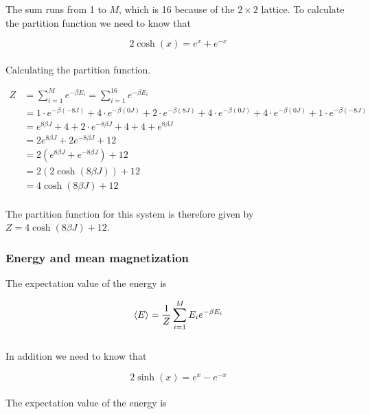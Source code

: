\documentclass{article}
\begin{document}
The sum runs from 1 to $M$, which is 16 because of the $ 2 \times 2 $ lattice. To calculate the partition function we need to know that

\begin{equation*}
    2 \cosh (x) = e^x + e^{-x}
\end{equation*} \\

Calculating the partition function.

\begin{align*}
  Z &= \sum_{i=1} ^{M} e^{- \beta E_i} = \sum_{i=1} ^{16} e^{- \beta E_i} \\
  &= 1 \cdot e^{- \beta (-8J)} + 4 \cdot e^{- \beta (0J)} + 2 \cdot e^{- \beta (8J)} + 4 \cdot e^{- \beta (0J)}
  + 4 \cdot e^{- \beta (0J)} + 1 \cdot e^{- \beta (-8J)} \\
  &= e^{8 \beta J} + 4 + 2 \cdot e^{-8 \beta J} + 4 + 4 + e^{8 \beta J} \\
  &= 2 e^{8 \beta J } + 2 e^{-8 \beta J} + 12 \\
  &= 2 \left( e^{8 \beta J} + e^{- 8 \beta J} \right) + 12 \\
  &= 2 \left( 2 \cosh(8 \beta J) \right) + 12 \\
  &= 4 \cosh(8 \beta J) + 12
\end{align*} \\

The partition function for this system is therefore given by $Z = 4 \cosh(8 \beta J) + 12$.

\subsubsection{Energy and mean magnetization}

The expectation value of the energy is

\begin{equation}    \label{eq:expectationenergy}
    \langle E \rangle = \frac{1}{Z} \sum _{i=1} ^M E_i e^{- \beta E_i} \\
\end{equation} \\

In addition we need to know that

\begin{equation*}
    2 \sinh (x) = e^x - e^{-x}
\end{equation*} \\

The expectation value of the energy is
\end{document}
